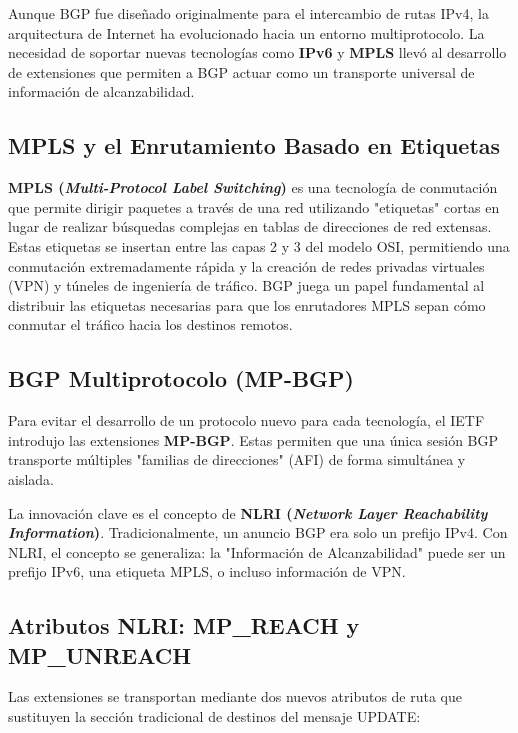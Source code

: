 Aunque BGP fue diseñado originalmente para el intercambio de rutas IPv4, la arquitectura de Internet ha evolucionado hacia un entorno multiprotocolo. La necesidad de soportar nuevas tecnologías como \textbf{IPv6} y \textbf{MPLS} llevó al desarrollo de extensiones que permiten a BGP actuar como un transporte universal de información de alcanzabilidad.

\subsection{MPLS y el Enrutamiento Basado en Etiquetas}

\textbf{MPLS (\textit{Multi-Protocol Label Switching})} es una tecnología de conmutación que permite dirigir paquetes a través de una red utilizando "etiquetas" cortas en lugar de realizar búsquedas complejas en tablas de direcciones de red extensas. Estas etiquetas se insertan entre las capas 2 y 3 del modelo OSI, permitiendo una conmutación extremadamente rápida y la creación de redes privadas virtuales (VPN) y túneles de ingeniería de tráfico. BGP juega un papel fundamental al distribuir las etiquetas necesarias para que los enrutadores MPLS sepan cómo conmutar el tráfico hacia los destinos remotos.

\subsection{BGP Multiprotocolo (MP-BGP)}

Para evitar el desarrollo de un protocolo nuevo para cada tecnología, el IETF introdujo las extensiones \textbf{MP-BGP}. Estas permiten que una única sesión BGP transporte múltiples "familias de direcciones" (AFI) de forma simultánea y aislada.

La innovación clave es el concepto de \textbf{NLRI (\textit{Network Layer Reachability Information})}. Tradicionalmente, un anuncio BGP era solo un prefijo IPv4. Con NLRI, el concepto se generaliza: la "Información de Alcanzabilidad" puede ser un prefijo IPv6, una etiqueta MPLS, o incluso información de VPN.

\subsection{Atributos NLRI: MP\_REACH y MP\_UNREACH}

Las extensiones se transportan mediante dos nuevos atributos de ruta que sustituyen la sección tradicional de destinos del mensaje UPDATE:

